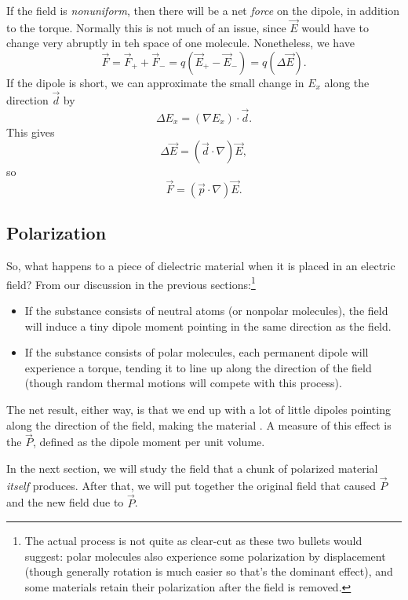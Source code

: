 If the field is \textit{nonuniform}, then there will be a net \textit{force} on the dipole, in addition to the torque. Normally this is not much of an issue, since $\vec{E}$ would have to change very abruptly in teh space of one molecule. Nonetheless, we have
\[\vec{F}=\vec{F}_++\vec{F}_-=q(\vec{E}_+-\vec{E}_-)=q(\Delta \vec{E}).\]
If the dipole is short, we can approximate the small change in $E_x$ along the direction $\vec{d}$ by
\[\Delta E_x=(\nabla E_x)\cdot \vec{d}.\]
This gives
\[\Delta\vec{E}=(\vec{d}\cdot \nabla)\vec{E},\]
so
\[\vec{F}=(\vec{p}\cdot \nabla)\vec{E}.\]

\subsection{Polarization}

So, what happens to a piece of dielectric material when it is placed in an electric field? From our discussion in the previous sections:\footnote{The actual process is not quite as clear-cut as these two bullets would suggest: polar molecules also experience some polarization by displacement (though generally rotation is much easier so that's the dominant effect), and some materials retain their polarization after the field is removed.}
\begin{itemize}
    \item If the substance consists of neutral atoms (or nonpolar molecules), the field will induce a tiny dipole moment pointing in the same direction as the field.
    \item If the substance consists of polar molecules, each permanent dipole will experience a torque, tending it to line up along the direction of the field (though random thermal motions will compete with this process).
\end{itemize}
The net result, either way, is that we end up with a lot of little dipoles pointing along the direction of the field, making the material . A measure of this effect is the  $\vec{P}$, defined as the dipole moment per unit volume.

In the next section, we will study the field that a chunk of polarized material \textit{itself} produces. After that, we will put together the original field that caused $\vec{P}$ and the new field due to $\vec{P}$.

